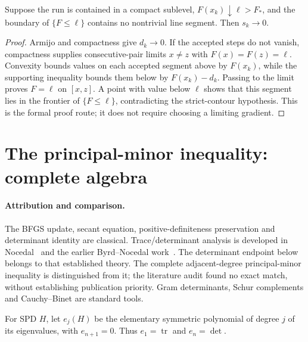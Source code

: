 \begin{lemma}\label{M:strictcontours}
Suppose the run is contained in a compact sublevel, $F(x_k)\downarrow\ell>F_*$, and the boundary of $\{F\le\ell\}$ contains no nontrivial line segment. Then $s_k\to0$.
\end{lemma}
\begin{proof}
Armijo and compactness give $d_k\to0$. If the accepted steps do not vanish, compactness supplies consecutive-pair limits $x\ne z$ with $F(x)=F(z)=\ell$. Convexity bounds values on each accepted segment above by $F(x_k)$, while the supporting inequality bounds them below by $F(x_k)-d_k$. Passing to the limit proves $F=\ell$ on $[x,z]$. A point with value below $\ell$ shows that this segment lies in the frontier of $\{F\le\ell\}$, contradicting the strict-contour hypothesis. This is the formal proof route; it does not require choosing a limiting gradient.
\end{proof}

\section{The principal-minor inequality: complete algebra}
\label{M:principal}
\paragraph{Attribution and comparison.}
The BFGS update, secant equation, positive-definiteness preservation and determinant identity are classical. Trace/determinant analysis is developed in Nocedal~\cite[Section~5, equations (5.7), (5.15) and (5.21)]{FND_N92} and the earlier Byrd--Nocedal work~\cite{FND_BN89}. The determinant endpoint below belongs to that established theory. The complete adjacent-degree principal-minor inequality is distinguished from it; the literature audit found no exact match, without establishing publication priority. Gram determinants, Schur complements and Cauchy--Binet are standard tools.

For SPD $H$, let $e_j(H)$ be the elementary symmetric polynomial of degree $j$ of its eigenvalues, with $e_{n+1}=0$. Thus $e_1=\operatorname{tr}$ and $e_n=\det$.

